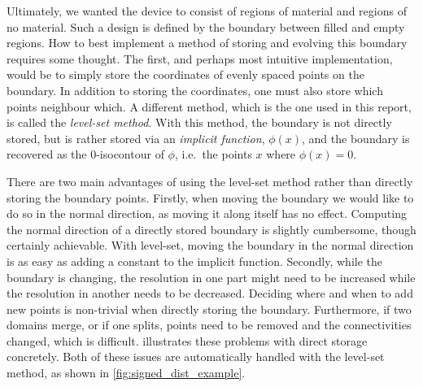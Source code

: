 Ultimately, we wanted the device to consist of regions of material and regions of
no material.
Such a design is defined by the boundary between filled and empty regions.
How to best implement a method of storing and evolving this boundary requires
some thought.
The first, and perhaps most intuitive implementation,
would be to simply store the coordinates of evenly spaced points on the boundary.
In addition to storing the coordinates, one must also store which points
neighbour which.
A different method, which is the one used in this report, is called
the \emph{level-set method}.
With this method, the boundary is not directly stored, but is rather stored via an
\emph{implicit function}, $\phi(x)$,
and the boundary is recovered as the
0-isocontour of $\phi$, i.e.\ the points $x$ where $\phi(x)=0$.

There are two main advantages of using the level-set method rather than
directly storing the boundary points.
Firstly, when moving the boundary we would like to do so in the normal
direction, as moving it along itself has no effect.
Computing the normal direction of a directly stored boundary is slightly cumbersome,
though certainly achievable.
With level-set, moving the boundary in the normal direction is as easy as adding
a constant to the implicit function.
Secondly, while the boundary is changing, the resolution in one part might need
to be increased while the resolution in another needs to be decreased. Deciding
where and when to add new points is non-trivial when directly storing the
boundary. Furthermore, if two domains merge, or if one splits, points
need to be removed and the connectivities changed, which is difficult.
 illustrates these problems with direct storage concretely.
Both of these issues are automatically handled with the level-set method, as
shown in \cref{fig:signed_dist_example}.

